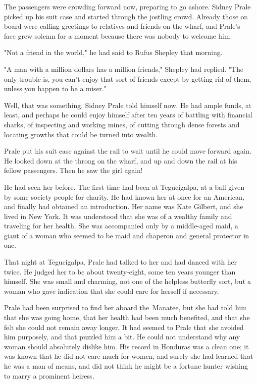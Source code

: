 \documentclass{novel}
\begin{document}
The passengers were crowding forward now, preparing to go ashore. Sidney Prale picked up his suit case and started through the jostling crowd. Already those on board were calling greetings to relatives and friends on the wharf, and Prale's face grew solemn for a moment because there was nobody to welcome him.

"Not a friend in the world," he had said to Rufus Shepley that morning.

"A man with a million dollars has a million friends," Shepley had replied. "The only trouble is, you can't enjoy that sort of friends except by getting rid of them, unless you happen to be a miser."

Well, that was something, Sidney Prale told himself now. He had ample funds, at least, and perhaps he could enjoy himself after ten years of battling with financial sharks, of inspecting and working mines, of cutting through dense forests and locating growths that could be turned into wealth.

Prale put his suit case against the rail to wait until he could move forward again. He looked down at the throng on the wharf, and up and down the rail at his fellow passengers. Then he saw the girl again!

He had seen her before. The first time had been at Tegucigalpa, at a ball given by some society people for charity. He had known her at once for an American, and finally had obtained an introduction. Her name was Kate Gilbert, and she lived in New York. It was understood that she was of a wealthy family and traveling for her health. She was accompanied only by a middle-aged maid, a giant of a woman who seemed to be maid and chaperon and general protector in one.

That night at Tegucigalpa, Prale had talked to her and had danced with her twice. He judged her to be about twenty-eight, some ten years younger than himself. She was small and charming, not one of the helpless butterfly sort, but a woman who gave indication that she could care for herself if necessary.

Prale had been surprised to find her aboard the Manatee, but she had told him that she was going home, that her health had been much benefited, and that she felt she could not remain away longer. It had seemed to Prale that she avoided him purposely, and that puzzled him a bit. He could not understand why any woman should absolutely dislike him. His record in Honduras was a clean one; it was known that he did not care much for women, and surely she had learned that he was a man of means, and did not think he might be a fortune hunter wishing to marry a prominent heiress.
\end{document}
